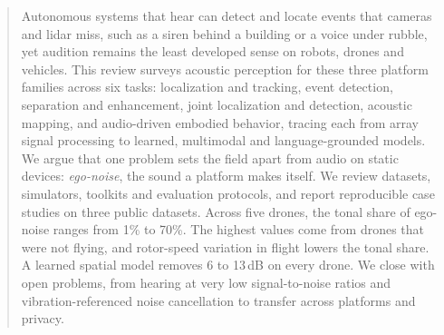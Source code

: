 \begin{abstract}
Autonomous systems that hear can detect and locate events that cameras and lidar miss, such as a siren behind a building or a voice under rubble, yet audition remains the least developed sense on robots, drones and vehicles.
This review surveys acoustic perception for these three platform families across six tasks: localization and tracking, event detection, separation and enhancement, joint localization and detection, acoustic mapping, and audio-driven embodied behavior, tracing each from array signal processing to learned, multimodal and language-grounded models.
We argue that one problem sets the field apart from audio on static devices: \emph{ego-noise}, the sound a platform makes itself.
We review datasets, simulators, toolkits and evaluation protocols, and report reproducible case studies on three public datasets.
Across five drones, the tonal share of ego-noise ranges from 1\% to 70\%. The highest values come from drones that were not flying, and rotor-speed variation in flight lowers the tonal share. A learned spatial model removes 6 to 13\,dB on every drone.
We close with open problems, from hearing at very low signal-to-noise ratios and vibration-referenced noise cancellation to transfer across platforms and privacy.
\end{abstract}
